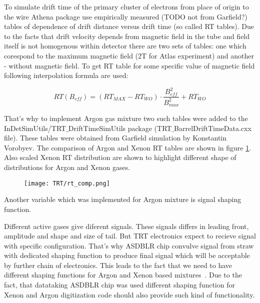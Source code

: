 To simulate drift time of the primary cluster of electrons from place of origin to the wire Athena package 
use empirically measured (TODO not from Garfield?) tables of dependence of drift distance versus drift time (so called RT tables). 
Due to the facts that drift velocity depends from magnetic field in the tube and field itself is not homogenous within detector 
there are two sets of tables: one which corespond to the maximum magnetic field (2T for Atlas experiment) and another - without magnetic field. To get RT table
for some specific value of magnetic field following interpolation formula are used:

\begin{displaymath}
    RT(B_{eff}) = (RT_{MAX} - RT_{WO}) \cdot \dfrac{B_{eff}^2}{B_{max}^2} + RT_{WO}
\end{displaymath}

That's why to implement Argon gas mixture two such tables were added to the \\ \mbox{InDetSimUtils/TRT$\_$DriftTimeSimUtils} package 
(\mbox{TRT$\_$BarrelDriftTimeData.cxx} file). These tables were obtained from Garfield simulation by Konstantin Vorobyev.
The comparison of Argon and Xenon RT tables are shown in figure \ref{fig:rt_comp}. Also scaled Xenon RT distribution are shown to highlight different shape of distributions for Argon and Xenon gases.


\begin{figure}[h]
\begin{center}
 \texttt{[image: TRT/rt\_comp.png]}
\caption{\label{fig:rt_comp} }
\end{center}
\end{figure}

Another variable which was implemented for Argon mixture is signal shaping function. 

Different active gases give diferent signals. These signals differs in leading front, amplitude and shape and size of tail. But TRT electronics expect to recieve signal with specific configuration.
That's why ASDBLR chip convulve signal from straw with dedicated shaping function to produce final signal which will be acceptable by further chain of electronics. This leads to the fact that we need
to have different shaping functions for Argon and Xenon based mixtures~\cite{Vorobev_private}. Due to the fact, that datataking ASDBLR chip was used different shaping function for Xenon and Argon 
digitization code should also provide such kind of functionality. 

